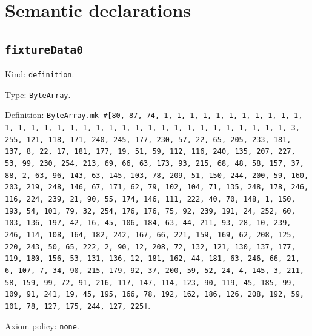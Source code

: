 \documentclass[11pt]{article}
\begin{document}
\section*{Semantic declarations}
\subsection*{\texttt{fixtureData0}}
\noindent Kind: \texttt{definition}.\par
\noindent Type: \texttt{ByteArray}.\par
\noindent Definition: \texttt{ByteArray.mk \#[80, 87, 74, 1, 1, 1, 1, 1, 1, 1, 1, 1, 1, 1, 1, 1, 1, 1, 1, 1, 1, 1, 1, 1, 1, 1, 1, 1, 1, 1, 1, 1, 1, 1, 1, 1, 3, 255, 121, 118, 171, 240, 245, 177, 230, 57, 22, 65, 205, 233, 181, 137, 8, 22, 17, 181, 177, 19, 51, 59, 112, 116, 240, 135, 207, 227, 53, 99, 230, 254, 213, 69, 66, 63, 173, 93, 215, 68, 48, 58, 157, 37, 88, 2, 63, 96, 143, 63, 145, 103, 78, 209, 51, 150, 244, 200, 59, 160, 203, 219, 248, 146, 67, 171, 62, 79, 102, 104, 71, 135, 248, 178, 246, 116, 224, 239, 21, 90, 55, 174, 146, 111, 222, 40, 70, 148, 1, 150, 193, 54, 101, 79, 32, 254, 176, 176, 75, 92, 239, 191, 24, 252, 60, 103, 136, 197, 42, 16, 45, 106, 184, 63, 44, 211, 93, 28, 10, 239, 246, 114, 108, 164, 182, 242, 167, 66, 221, 159, 169, 62, 208, 125, 220, 243, 50, 65, 222, 2, 90, 12, 208, 72, 132, 121, 130, 137, 177, 119, 180, 156, 53, 131, 136, 12, 181, 162, 44, 181, 63, 246, 66, 21, 6, 107, 7, 34, 90, 215, 179, 92, 37, 200, 59, 52, 24, 4, 145, 3, 211, 58, 159, 99, 72, 91, 216, 117, 147, 114, 123, 90, 119, 45, 185, 99, 109, 91, 241, 19, 45, 195, 166, 78, 192, 162, 186, 126, 208, 192, 59, 101, 78, 127, 175, 244, 127, 225]}.\par
\noindent Axiom policy: \texttt{none}.\par
\end{document}
